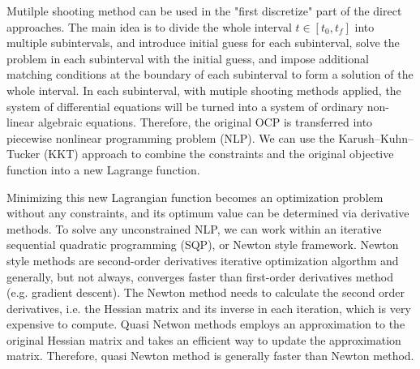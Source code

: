 \documentclass  [
  paper    = a4,
  BCOR     = 10mm,
  twoside,
  fontsize = 12pt,
  fleqn,
  toc      = bibnumbered,
  toc      = listofnumbered,
  numbers  = noendperiod,
  headings = normal,
  listof   = leveldown,
  version  = 3.03
]                                       {scrreprt}
\newcommand{\<}{\langle}
\renewcommand{\>}{\rangle}
\begin{document}
Mutilple shooting method can be used in the "first discretize" part of the direct approaches. The main idea is to divide the whole interval $t \in [t_0, t_f]$ into multiple subintervals, and introduce initial guess for each subinterval,  solve the problem in each subinterval with the initial guess, and impose additional matching conditions at the boundary of each subinterval to form a solution of the whole interval. In each subinterval, with mutiple shooting methods applied, the system of differential equations will be turned into a system of ordinary non-linear algebraic equations. Therefore, the original OCP is transferred into piecewise nonlinear programming problem (NLP). We can use the Karush–Kuhn–Tucker (KKT) approach to combine the constraints and the original objective function into a new Lagrange function. 

Minimizing this new Lagrangian function becomes an optimization problem without any constraints, and its optimum value can be determined via derivative methods. To solve any unconstrained NLP, we can work within an iterative sequential quadratic programming (SQP), or Newton style framework. Newton style methods are second-order derivatives iterative optimization algorthm and generally, but not always, converges faster than first-order derivatives method (e.g. gradient descent). The Newton method needs to calculate the second order derivatives, i.e. the Hessian matrix and its inverse in each iteration, which is very expensive to compute. Quasi Netwon methods employs an approximation to the original Hessian matrix and takes an efficient way to update the approximation matrix. Therefore, quasi Newton method is generally faster than Newton method. 

\end{document}
